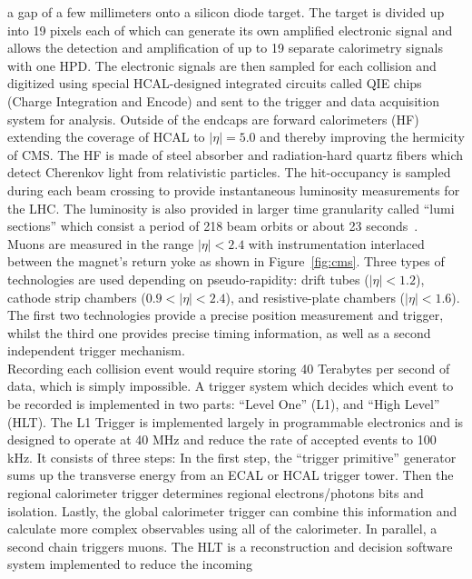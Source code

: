 a gap of a few millimeters onto a silicon diode target. The target is divided up into 19 pixels each 
of which can generate its own amplified electronic signal and allows the detection and amplification 
of up to 19 separate calorimetry signals with one HPD. The electronic signals are then sampled for 
each collision and digitized using special HCAL-designed integrated circuits called QIE chips (Charge 
Integration and Encode) and sent to the trigger and data acquisition system for analysis.
Outside of the endcaps are forward calorimeters (HF) extending the coverage of HCAL to $|\eta| = 5.0$ 
and thereby improving the hermicity of CMS. The HF is made of steel absorber and radiation-hard
quartz fibers which detect Cherenkov light from relativistic particles. The hit-occupancy is sampled
during each beam crossing to provide instantaneous luminosity measurements for the LHC. The luminosity
is also provided in larger time granularity called ``lumi sections'' which consist a period of
218 beam orbits or about 23 seconds~\cite{CMS-PAS-SMP-12-008}.\\ 
\indent Muons are measured in the range  $|\eta| < 2.4$ with instrumentation interlaced between the magnet's
return yoke as shown in Figure~\ref{fig:cms}. Three types of technologies are used depending
on pseudo-rapidity: drift tubes ($|\eta| < 1.2$), cathode strip chambers ($0.9 < |\eta| < 2.4$), and
resistive-plate chambers ($|\eta| < 1.6$). The first two technologies provide a precise position measurement 
and trigger, whilst the third one provides precise timing information, as well as a second independent 
trigger mechanism. \\
\indent Recording each collision event would require storing 40 Terabytes per second of data, which
is simply impossible. A trigger system which decides which event to be recorded is implemented in 
two parts: ``Level One'' (L1), and ``High Level'' (HLT). The L1 Trigger is implemented largely in 
programmable electronics and is designed to operate at 40 MHz and reduce the rate of 
accepted events to 100 kHz. It consists of three steps: In the first step, the
``trigger primitive'' generator sums up the transverse energy from an ECAL or HCAL trigger
tower. Then the regional calorimeter trigger determines regional electrons/photons bits and isolation. 
Lastly, the global calorimeter trigger can combine this information and
calculate more complex observables using all of the calorimeter. In parallel, a second chain
triggers muons. 
The HLT is a reconstruction and decision software system implemented to reduce the incoming 
